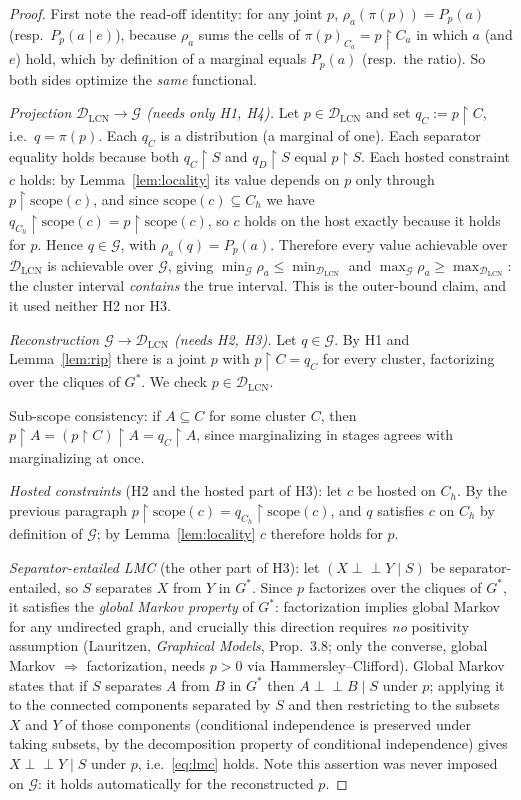 \documentclass[11pt]{article}
\theoremstyle{definition}
\newcommand{\indep}{\perp\!\!\!\perp}
\newcommand{\DLCN}{\mathcal{D}_{\mathrm{LCN}}}
\newcommand{\scope}{\mathrm{scope}}
\newcommand{\restr}{\!\restriction\!}
\newcommand{\readoff}{\rho}
\begin{document}
\begin{proof}
First note the read-off identity: for any joint $p$,
$\readoff_a(\pi(p))=P_p(a)$ (resp.\ $P_p(a\mid e)$), because $\readoff_a$ sums
the cells of $\pi(p)_{C_a}=p\restr C_a$ in which $a$ (and $e$) hold, which by
definition of a marginal equals $P_p(a)$ (resp.\ the ratio). So both sides
optimize the \emph{same} functional.

\emph{Projection $\DLCN\to\mathcal G$ (needs only H1, H4).} Let $p\in\DLCN$ and
set $q_C:=p\restr C$, i.e.\ $q=\pi(p)$. Each $q_C$ is a distribution (a marginal
of one). Each separator equality holds because both $q_C\restr S$ and
$q_D\restr S$ equal $p\restr S$. Each hosted constraint $c$ holds: by
Lemma~\ref{lem:locality} its value depends on $p$ only through
$p\restr\scope(c)$, and since $\scope(c)\subseteq C_h$ we have
$q_{C_h}\restr\scope(c)=p\restr\scope(c)$, so $c$ holds on the host exactly
because it holds for $p$. Hence $q\in\mathcal G$, with
$\readoff_a(q)=P_p(a)$. Therefore every value achievable over $\DLCN$ is
achievable over $\mathcal G$, giving
$\min_{\mathcal G}\readoff_a\le\min_{\DLCN}$ and
$\max_{\mathcal G}\readoff_a\ge\max_{\DLCN}$: the cluster interval
\emph{contains} the true interval. This is the outer-bound claim, and it used
neither H2 nor H3.

\emph{Reconstruction $\mathcal G\to\DLCN$ (needs H2, H3).} Let
$q\in\mathcal G$. By H1 and Lemma~\ref{lem:rip} there is a joint $p$ with
$p\restr C=q_C$ for every cluster, factorizing over the cliques of $G^\ast$. We
check $p\in\DLCN$.

Sub-scope consistency: if $A\subseteq C$ for some cluster $C$, then
$p\restr A=(p\restr C)\restr A=q_C\restr A$, since marginalizing in stages agrees
with marginalizing at once.

\emph{Hosted constraints} (H2 and the hosted part of H3): let $c$ be hosted on
$C_h$. By the previous paragraph $p\restr\scope(c)=q_{C_h}\restr\scope(c)$, and
$q$ satisfies $c$ on $C_h$ by definition of $\mathcal G$; by
Lemma~\ref{lem:locality} $c$ therefore holds for $p$.

\emph{Separator-entailed LMC} (the other part of H3): let
$(X\indep Y\mid S)$ be separator-entailed, so $S$ separates $X$ from $Y$ in
$G^\ast$. Since $p$ factorizes over the cliques of $G^\ast$, it satisfies the
\emph{global Markov property} of $G^\ast$: factorization implies global Markov
for any undirected graph, and crucially this direction requires \emph{no}
positivity assumption (Lauritzen, \emph{Graphical Models}, Prop.~3.8; only the
converse, global Markov $\Rightarrow$ factorization, needs $p>0$ via
Hammersley--Clifford). Global Markov states that if $S$ separates $A$ from $B$ in
$G^\ast$ then $A\indep B\mid S$ under $p$; applying it to the connected
components separated by $S$ and then restricting to the subsets $X$ and $Y$ of
those components (conditional independence is preserved under taking subsets, by
the decomposition property of conditional independence) gives
$X\indep Y\mid S$ under $p$, i.e.\ \eqref{eq:lmc} holds. Note this assertion was
never imposed on $\mathcal G$: it holds automatically for the reconstructed $p$.


\end{proof}
\end{document}
